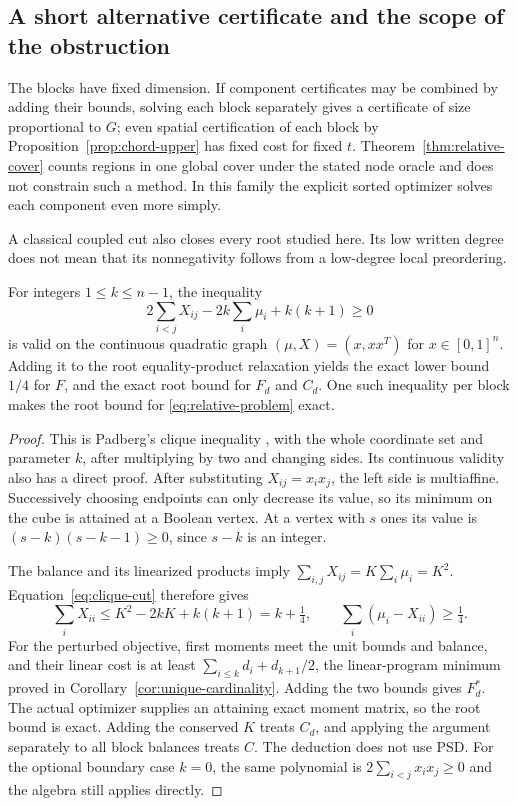 \subsection{A short alternative certificate and the scope of the obstruction}
The blocks have fixed dimension. If component certificates may be
combined by adding their bounds, solving each block separately gives a
certificate of size proportional to $G$; even spatial certification of
each block by Proposition~\ref{prop:chord-upper} has fixed cost for fixed
$t$. Theorem~\ref{thm:relative-cover} counts regions in one global cover
under the stated node oracle and does not constrain such a method. In this
family the explicit sorted optimizer solves each component even more
simply.

A classical coupled cut also closes every root studied here. Its low
written degree does not mean that its nonnegativity follows from a
low-degree local preordering.

\begin{proposition}
\label{prop:clique-escape}
For integers $1\le k\le n-1$, the inequality
\begin{equation}\label{eq:clique-cut}
 2\sum_{i<j}X_{ij}-2k\sum_i\mu_i+k(k+1)\ge0
\end{equation}
is valid on the continuous quadratic graph
$(\mu,X)=(x,xx^T)$ for $x\in[0,1]^n$.
Adding it to the root equality-product relaxation yields the exact lower
bound $1/4$ for $F$, and the exact root bound for $F_d$ and $C_d$.
One such inequality per block makes the root bound for
\eqref{eq:relative-problem} exact.
\end{proposition}
\begin{proof}
This is Padberg's clique inequality
\citep[Lemma 2, equation (17)]{Padberg1989}, with the whole coordinate
set and parameter $k$, after multiplying by two and changing sides.
Its continuous validity also has a direct proof. After substituting
$X_{ij}=x_ix_j$, the left side is multiaffine. Successively choosing
endpoints can only decrease its value, so its minimum on the cube is
attained at a Boolean vertex. At a vertex with $s$ ones its value is
$(s-k)(s-k-1)\ge0$, since $s-k$ is an integer.

The balance and its linearized products imply
$\sum_{i,j}X_{ij}=K\sum_i\mu_i=K^2$.
Equation~\eqref{eq:clique-cut} therefore gives
\[
 \sum_iX_{ii}\le K^2-2kK+k(k+1)=k+\tfrac14,
 \qquad \sum_i(\mu_i-X_{ii})\ge\tfrac14.
\]
For the perturbed objective, first moments meet the unit bounds and
balance, and their linear cost is at least
$\sum_{i\le k}d_i+d_{k+1}/2$, the linear-program minimum proved in
Corollary~\ref{cor:unique-cardinality}. Adding the two bounds gives
$F_d^*$. The actual optimizer supplies an attaining exact moment matrix,
so the root bound is exact. Adding the conserved $K$ treats $C_d$,
and applying the argument separately to all block balances treats $C$.
The deduction does not use PSD. For the optional boundary case $k=0$,
the same polynomial is $2\sum_{i<j}x_ix_j\ge0$ and the algebra still
applies directly.
\end{proof}

